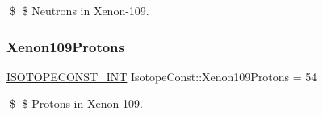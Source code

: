 \$ \$ Neutrons in Xenon-\/109. \mbox{\label{group___isotope_const-_xenon-_xe109_ga57c26e3478d15505efed997e387354d2}} 
\subsubsection{\texorpdfstring{Xenon109\+Protons}{Xenon109Protons}}
{\footnotesize\ttfamily \mbox{\hyperlink{group___isotope_const-_macros_ga5f18360b3e99483a35c32d789e62621c}{I\+S\+O\+T\+O\+P\+E\+C\+O\+N\+S\+T\+\_\+\+I\+NT}} Isotope\+Const\+::\+Xenon109\+Protons = 54}

\$ \$ Protons in Xenon-\/109. 